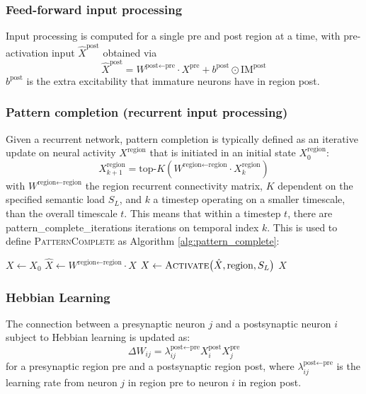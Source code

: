\documentclass{article}
\begin{document}
\subsubsection*{Feed-forward input processing}
Input processing is computed for a single pre and post region at a time, with pre-activation input $\hat{X}^\textrm{post}$ obtained via
\begin{equation}
    \hat{X}^\textrm{post} = W^{\textrm{post}\leftarrow\textrm{pre}} \cdot X^\textrm{pre} + b^\textrm{post}\odot\textrm{IM}^\textrm{post}
\end{equation}
$b^\textrm{post}$ is the extra excitability that immature neurons have in region post.
\subsubsection*{Pattern completion (recurrent input processing)}
Given a recurrent network, pattern completion is typically defined as an iterative update on neural activity $X^\textrm{region}$ that is initiated in an initial state $X^\textrm{region}_0$:
\begin{equation}
    X^{\textrm{region}}_{k+1} = \textrm{top-}K(W^{\textrm{region}\leftarrow\textrm{region}}\cdot X^\textrm{region}_{k})
\end{equation}
with $W^{\textrm{region}\leftarrow\textrm{region}}$ the region recurrent connectivity matrix, $K$ dependent on the specified semantic load $S_L$, and $k$ a timestep operating on a smaller timescale,  than the overall timescale $t$. This means that within a timestep $t$, there are pattern\_complete\_iterations iterations on temporal index $k$. This is used to define \textsc{PatternComplete}  as Algorithm \ref{alg:pattern_complete}:
\begin{algorithm}[h!]
\caption{Pattern Completion}\label{alg:pattern_complete}
\begin{algorithmic}[1]
    \State $X \gets X_0$
        \State $\hat{X} \gets W^{\textrm{region} \leftarrow \textrm{region}} \cdot X$
    \State $X \gets \textsc{Activate}\bigl(\hat{X}, \textrm{region}, S_L \bigr)$
    \EndFor
    \State \Return $X$
\EndFunction
\end{algorithmic}
\end{algorithm}
\subsubsection*{Hebbian Learning}
The connection between a presynaptic neuron $j$ and a postsynaptic neuron $i$ subject to Hebbian learning is updated as:
\begin{equation}
            \Delta W_{ij} = \lambda_{ij}^{\textrm{post} \leftarrow \textrm{pre}}
            X_i^\textrm{post} X_j^\textrm{pre}
\end{equation}
for a presynaptic region pre and a postsynaptic region post, where $\lambda_{ij}^{\textrm{post} \leftarrow \textrm{pre}}$ is the learning rate from neuron $j$ in region pre to neuron $i$ in region post.
\end{document}
